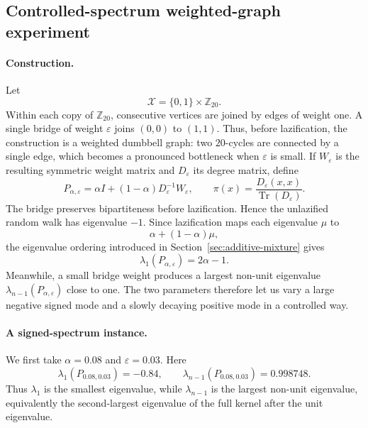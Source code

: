 \documentclass[11pt]{article}
\newcommand{\1}{\mathbf{1}}
\newcommand{\X}{\mathcal{X}}
\begin{document}
\subsection{Controlled-spectrum weighted-graph experiment}
\label{subsec:controlled-spectrum-experiment}

\paragraph{Construction.}
Let
\[
    \X=\{0,1\}\times\mathbb Z_{20}.
\]
Within each copy of $\mathbb Z_{20}$, consecutive vertices are joined
by edges of weight one.  A single bridge of weight $\varepsilon$ joins
$(0,0)$ to $(1,1)$.  Thus, before lazification, the construction is a
weighted dumbbell graph: two $20$-cycles are
connected by a single edge, which becomes a pronounced bottleneck when
$\varepsilon$ is small.  If $W_\varepsilon$ is the resulting symmetric
weight matrix and $D_\varepsilon$ its degree matrix, define
\begin{equation*}
    P_{\alpha,\varepsilon}
    =\alpha I+(1-\alpha)D_\varepsilon^{-1}W_\varepsilon,
    \qquad
    \pi(x)=
    \frac{D_\varepsilon(x,x)}
         {\operatorname{Tr}(D_\varepsilon)}.
\end{equation*}
The bridge preserves bipartiteness before lazification.  Hence the
unlazified random walk has eigenvalue $-1$.  Since lazification maps
each eigenvalue $\mu$ to
\[
\alpha+(1-\alpha)\mu,
\]
the eigenvalue ordering introduced in Section~\ref{sec:additive-mixture} gives
\begin{equation*}
	\lambda_1(P_{\alpha,\varepsilon})=2\alpha-1.
\end{equation*}
Meanwhile, a small bridge weight produces a largest non-unit
eigenvalue $\lambda_{n-1}(P_{\alpha,\varepsilon})$ close to one.
The two parameters therefore let us vary a large negative signed mode
and a slowly decaying positive mode in a controlled way.

\paragraph{A signed-spectrum instance.}
We first take $\alpha=0.08$ and $\varepsilon=0.03$.  Here
\[
\lambda_1(P_{0.08,0.03})=-0.84,
\qquad
\lambda_{n-1}(P_{0.08,0.03})=0.998748.
\]
Thus $\lambda_1$ is the smallest eigenvalue, while
$\lambda_{n-1}$ is the largest non-unit eigenvalue, equivalently the
second-largest eigenvalue of the full kernel after the unit
eigenvalue.
\end{document}
